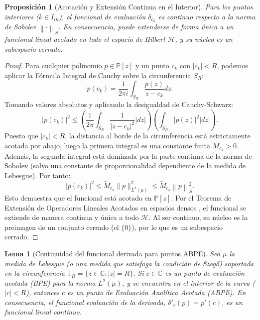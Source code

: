 \documentclass[12pt,a4paper]{article}
\newtheorem{proposicion}{Proposición}
\newtheorem{lema}{Lema}
\theoremstyle{definition}
\theoremstyle{remark}
\newcommand{\Poly}{\mathbb{P}[z]}
\newcommand{\norm}[1]{\left\| #1 \right\|_S}
\newcommand{\abs}[1]{\left| #1 \right|}
\begin{document}
\begin{proposicion}[Acotación y Extensión Continua en el Interior]
    Para los puntos interiores ($k \in I_{in}$), el funcional de evaluación $\delta_{c_k}$ es continuo respecto a la norma de Sobolev $\norm{\cdot}$. En consecuencia, puede extenderse de forma única a un funcional lineal acotado en todo el espacio de Hilbert $\mathcal{H}$, y su núcleo es un subespacio cerrado.
\end{proposicion}

\begin{proof}
    Para cualquier polinomio $p \in \Poly$ y un punto $c_k$ con $\abs{c_k} < R$, podemos aplicar la Fórmula Integral de Cauchy sobre la circunferencia $S_R$:
    $$ p(c_k) = \frac{1}{2\pi i} \int_{S_R} \frac{p(z)}{z - c_k} dz. $$
    Tomando valores absolutos y aplicando la desigualdad de Cauchy-Schwarz:
    $$ \abs{p(c_k)}^2 \leq \left( \frac{1}{2\pi} \int_{S_R} \frac{1}{\abs{z - c_k}^2} \abs{dz} \right) \left( \int_{S_R} \abs{p(z)}^2 \abs{dz} \right). $$
    Puesto que $\abs{c_k} < R$, la distancia al borde de la circunferencia está estrictamente acotada por abajo, luego la primera integral es una constante finita $M_{c_k} > 0$. Además, la segunda integral está dominada por la parte continua de la norma de Sobolev (salvo una constante de proporcionalidad dependiente de la medida de Lebesgue). Por tanto:
    $$ \abs{p(c_k)}^2 \leq \tilde{M}_{c_k} \|p\|_{L^2(\mu)}^2 \leq \tilde{M}_{c_k} \norm{p}^2. $$
    Esto demuestra que el funcional está acotado en $\Poly$. Por el Teorema de Extensión de Operadores Lineales Acotados en espacios densos \cite{kreyszig1989introductory}, el funcional se extiende de manera continua y única a todo $\mathcal{H}$. Al ser continuo, su núcleo es la preimagen de un conjunto cerrado (el $\{0\}$), por lo que es un subespacio cerrado.
\end{proof}

\begin{lema}[Continuidad del funcional derivada para puntos ABPE]
    \label{lema:ABPE_derivada}
    Sea $\mu$ la medida de Lebesgue (o una medida que satisfaga la condición de Szegő) soportada en la circunferencia $\mathbb{T}_R = \{z \in \mathbb{C} : |z| = R\}$. Si $c \in \mathbb{C}$ es un punto de evaluación acotada (BPE) para la norma $L^2(\mu)$, y se encuentra en el interior de la curva ($|c| < R$), entonces $c$ es un punto de Evaluación Analítica Acotada (ABPE). En consecuencia, el funcional evaluación de la derivada, $\delta'_c(p) = p'(c)$, es un funcional lineal continuo.
\end{lema}
\end{document}
